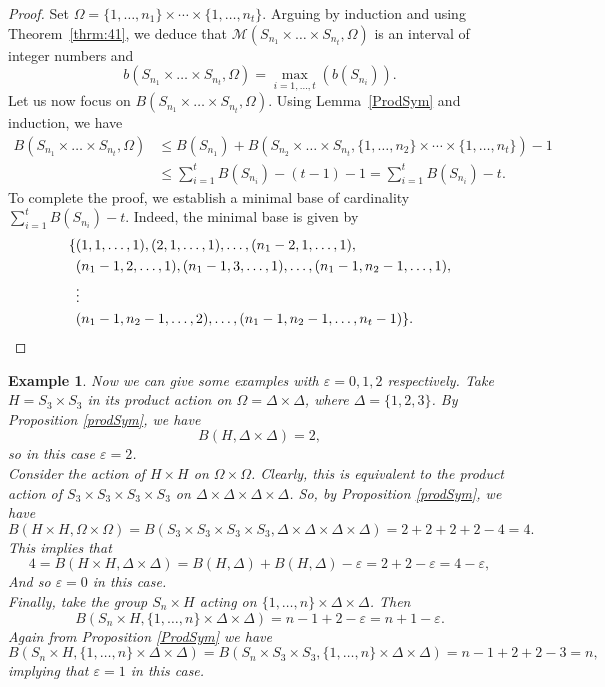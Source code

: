 \documentclass{amsart}
\newtheorem{example}[theorem]{Example}
\begin{document}
	\begin{proof}
Set $\Omega=\{1,\ldots,n_1\}\times\cdots\times\{1,\ldots,n_t\}$.
Arguing by induction and using Theorem~\ref{thrm:41}, we deduce that $\mathcal{M}(S_{n_1}\times \dots \times S_{n_t},\Omega)$ is an interval of integer numbers and 
		\[
			b(S_{n_1}\times \dots \times S_{n_t},\Omega) = \max_{i=1,\dots,t}(b(S_{n_i})).
		\]
		Let us now focus on $B(S_{n_1}\times \dots \times S_{n_t},\Omega)$. Using Lemma~\ref{ProdSym} and induction, we have
		\begin{align*}
			B(S_{n_1}\times \dots \times S_{n_t},\Omega) &\leq B(S_{n_1}) + B(S_{n_2}\times \dots \times S_{n_t},\{1,\ldots,n_2\}\times\cdots\times\{1,\ldots,n_t\})-1 \\
			&\leq \sum_{i=1}^t B(S_{n_i}) - (t-1)-1 = \sum_{i=1}^t B(S_{n_i}) -t.
		\end{align*}
		To complete the proof, we establish a minimal base of cardinality $\sum_{i=1}^t B(S_{n_i})-t$. Indeed, the  minimal base is given by
		\begin{align*}
			\{&(1,1,\dots,1) ,(2,1,\dots,1) ,\dots, (n_1-2,1,\dots,1), \\ &(n_1-1,2,\dots,1), (n_1-1,3,\dots,1), \dots, (n_1-1,n_2-1,\dots,1), \\
			&\vdots \\
			&(n_1-1,n_2-1,\dots,2),\dots, (n_1-1,n_2-1,\dots,n_t-1)\}.\qedhere
		\end{align*}
	\end{proof}

\begin{example}\label{example1}{\rm
	Now we can give some examples with $\varepsilon=0,1,2$ respectively. Take $H=S_3 \times S_3$ in its product action on $\Omega=\Delta \times \Delta$, where $\Delta = \{1,2,3\}$. By Proposition \ref{prodSym}, we have $$B(H, \Delta \times \Delta) = 2,$$ so in this case $\varepsilon=2$. \\
	Consider the action of $H \times H$ on $\Omega \times \Omega$. Clearly, this is equivalent to the product action of $S_3\times S_3 \times S_3 \times S_3  $ on $\Delta\times \Delta \times \Delta \times \Delta $. So, by Proposition \ref{prodSym}, we have $$B(H \times H , \Omega \times \Omega)=B(S_3\times S_3 \times S_3 \times S_3,\Delta\times \Delta \times \Delta \times \Delta) = 2+2+2+2-4 = 4.$$
	This implies that $$4 = B(H\times H,\Delta\times \Delta) = B(H,\Delta)+B(H,\Delta)-\varepsilon = 2+2-\varepsilon = 4-\varepsilon,$$ And so $\varepsilon = 0$ in this case.\\
	Finally, take the group $S_n \times H$ acting on $\{1,\dots,n\} \times \Delta \times \Delta$. Then $$B(S_n \times H,\{1,\dots,n\}\times \Delta \times \Delta) = n-1+2-\varepsilon = n+1-\varepsilon.$$ Again from Proposition \ref{ProdSym} we have
	\[
		B(S_n \times H,\{1,\dots,n\}\times \Delta \times \Delta) = B(S_n \times S_3 \times S_3, \{1,\dots,n\}\times \Delta \times \Delta) = n-1+2+2-3 = n,
	\]
	implying that $\varepsilon = 1$ in this case.}
\end{example}
\end{document}
